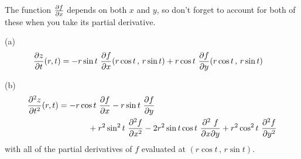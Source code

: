\begin{hint}
The function $\pdiff{f}{x}$ depends on both $x$ and $y$, so don't forget to account for both of these when you take its partial derivative.
\end{hint}

\begin{answer}
(a) \begin{align*}
\pdiff{z}{t}(r,t) &= -r\sin t\  \pdiff{f}{x}(r\cos t\,,\,r\sin t)
                     +r\cos t\  \pdiff{f}{y}(r\cos t\,,\,r\sin t)
\end{align*}

(b)
\begin{align*}
\frac{\partial^2 z}{\partial t^2}(r,t) 
&= -r\cos t \  \pdiff{f}{x}
   -r\sin t \  \pdiff{f}{y} \\
&\hskip0.5in
  +r^2\sin^2 t\ \frac{\partial^2 f}{\partial x^2}
  -2r^2\sin t\cos t\ 
       \frac{\partial^2\ f}{\partial x\partial y}
  +r^2\cos^2 t\ \frac{\partial^2 f}{\partial y^2}
\end{align*}
with all of the partial derivatives of $f$ evaluated at 
$(r\cos t\,,\,r\sin t)$.
\end{answer}

